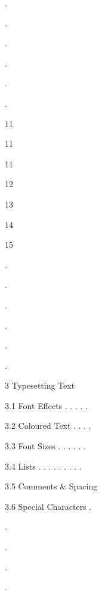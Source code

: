 \documentclass[a4paper,portrait,12pt]{article}
\begin{document}
.


.


.


.


.


.





11


11


11


12


13


14


15





.


.


.


.


.


.





\begin{flushleft}
3 Typesetting Text
\end{flushleft}


\begin{flushleft}
3.1 Font Effects . . . . .
\end{flushleft}


\begin{flushleft}
3.2 Coloured Text . . . .
\end{flushleft}


\begin{flushleft}
3.3 Font Sizes . . . . . .
\end{flushleft}


\begin{flushleft}
3.4 Lists . . . . . . . . .
\end{flushleft}


\begin{flushleft}
3.5 Comments \& Spacing
\end{flushleft}


\begin{flushleft}
3.6 Special Characters .
\end{flushleft}





.


.


.


.
\end{document}
